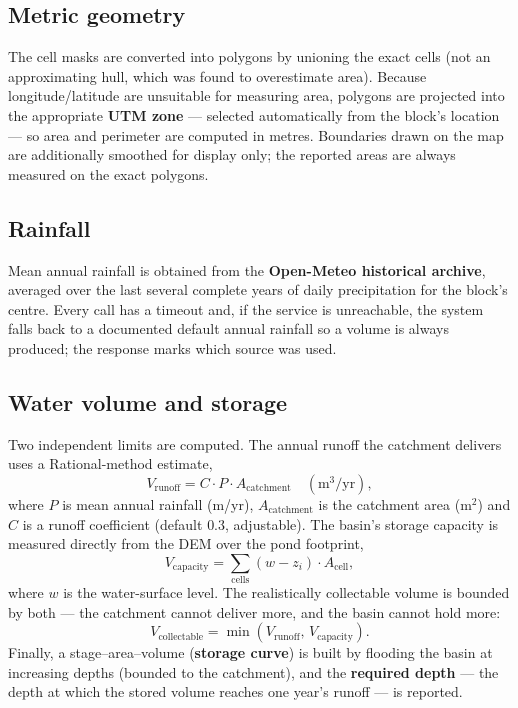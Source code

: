 \documentclass[11pt]{article}
\begin{document}
\subsection{Metric geometry}
The cell masks are converted into polygons by unioning the exact cells (not an
approximating hull, which was found to overestimate area). Because longitude/latitude
are unsuitable for measuring area, polygons are projected into the appropriate
\textbf{UTM zone} --- selected automatically from the block's location --- so area and
perimeter are computed in metres. Boundaries drawn on the map are additionally
smoothed for display only; the reported areas are always measured on the exact
polygons.

\subsection{Rainfall}
Mean annual rainfall is obtained from the \textbf{Open-Meteo historical archive},
averaged over the last several complete years of daily precipitation for the block's
centre. Every call has a timeout and, if the service is unreachable, the system falls
back to a documented default annual rainfall so a volume is always produced; the
response marks which source was used.

\subsection{Water volume and storage}
Two independent limits are computed. The annual runoff the catchment delivers uses a
Rational-method estimate,
\begin{equation}
V_{\text{runoff}} = C \cdot P \cdot A_{\text{catchment}} \quad (\text{m}^3/\text{yr}),
\end{equation}
where $P$ is mean annual rainfall (m/yr), $A_{\text{catchment}}$ is the catchment area
(m$^2$) and $C$ is a runoff coefficient (default $0.3$, adjustable). The basin's
storage capacity is measured directly from the DEM over the pond footprint,
\begin{equation}
V_{\text{capacity}} = \sum_{\text{cells}} (w - z_i)\cdot A_{\text{cell}},
\end{equation}
where $w$ is the water-surface level. The realistically collectable volume is bounded
by both --- the catchment cannot deliver more, and the basin cannot hold more:
\begin{equation}
V_{\text{collectable}} = \min\!\left(V_{\text{runoff}},\, V_{\text{capacity}}\right).
\end{equation}
Finally, a stage--area--volume (\textbf{storage curve}) is built by flooding the basin
at increasing depths (bounded to the catchment), and the \textbf{required depth} ---
the depth at which the stored volume reaches one year's runoff --- is reported.
\end{document}
